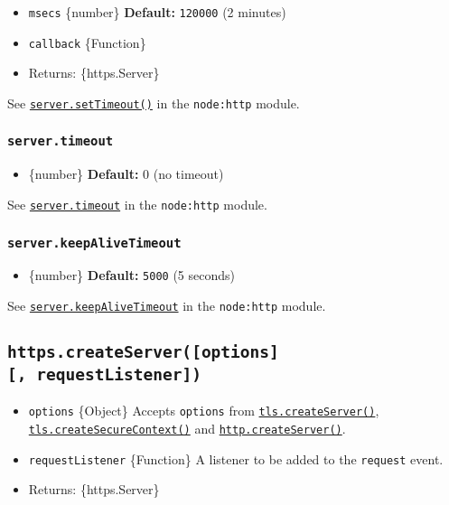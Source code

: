 \begin{itemize}
\tightlist
\item
  \texttt{msecs} \{number\} \textbf{Default:} \texttt{120000} (2
  minutes)
\item
  \texttt{callback} \{Function\}
\item
  Returns: \{https.Server\}
\end{itemize}

See
\href{http.md\#serversettimeoutmsecs-callback}{\texttt{server.setTimeout()}}
in the \texttt{node:http} module.

\subsubsection{\texorpdfstring{\texttt{server.timeout}}{server.timeout}}\label{server.timeout}

\begin{itemize}
\tightlist
\item
  \{number\} \textbf{Default:} 0 (no timeout)
\end{itemize}

See \href{http.md\#servertimeout}{\texttt{server.timeout}} in the
\texttt{node:http} module.

\subsubsection{\texorpdfstring{\texttt{server.keepAliveTimeout}}{server.keepAliveTimeout}}\label{server.keepalivetimeout}

\begin{itemize}
\tightlist
\item
  \{number\} \textbf{Default:} \texttt{5000} (5 seconds)
\end{itemize}

See
\href{http.md\#serverkeepalivetimeout}{\texttt{server.keepAliveTimeout}}
in the \texttt{node:http} module.

\subsection{\texorpdfstring{\texttt{https.createServer({[}options{]}{[},\ requestListener{]})}}{https.createServer({[}options{]}{[}, requestListener{]})}}\label{https.createserveroptions-requestlistener}

\begin{itemize}
\tightlist
\item
  \texttt{options} \{Object\} Accepts \texttt{options} from
  \href{tls.md\#tlscreateserveroptions-secureconnectionlistener}{\texttt{tls.createServer()}},
  \href{tls.md\#tlscreatesecurecontextoptions}{\texttt{tls.createSecureContext()}}
  and
  \href{http.md\#httpcreateserveroptions-requestlistener}{\texttt{http.createServer()}}.
\item
  \texttt{requestListener} \{Function\} A listener to be added to the
  \texttt{\textquotesingle{}request\textquotesingle{}} event.
\item
  Returns: \{https.Server\}
\end{itemize}

